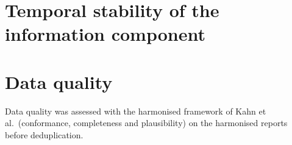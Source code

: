 \documentclass[11pt]{article}
\begin{document}
\begin{table}[htbp]
\centering\small
\caption{Infant design: reports in children younger than \POInfantMonths{} months, VA-MENGOC-BC
against other Finlay vaccines.}
\label{tab:S-disp-infant}
\POTableDispInfantFinlayComparator
\end{table}

\begin{table}[htbp]
\centering\small
\caption{Single-vaccine design: VA-MENGOC-BC given alone against other Finlay vaccines given
alone.}
\label{tab:S-disp-single}
\POTableDispExcludingCoadministration
\end{table}

\begin{table}[htbp]
\centering\small
\caption{Primary design keeping the \PONScheduleInvalid{} VA-MENGOC-BC doses recorded outside the
vaccination schedule.}
\label{tab:S-disp-schedule}
\POTableDispPrimaryIncludingScheduleErrors
\end{table}

\begin{table}[htbp]
\centering\small
\caption{Concomitant vaccines: VA-MENGOC-BC reports with co-administered vaccines against
VA-MENGOC-BC given alone.}
\label{tab:S-disp-concomitant}
\POTableDispConcomitantInfluence
\end{table}

\section{Temporal stability of the information component}\label{sec:S-cumic}
\begin{table}[htbp]
\centering\small
\caption{Cumulative information component (IC) with 95\% credibility interval, recomputed with
the reports accumulated up to the end of each year, for the four most frequently reported events
and for every event meeting the primary signal criterion.}
\label{tab:S-cumic}
\POTableCumulativeIC
\end{table}

\section{Data quality}\label{sec:S-dq}
Data quality was assessed with the harmonised framework of Kahn et al.\ (conformance,
completeness and plausibility) on the harmonised reports before deduplication.

\begin{table}[htbp]
\centering\small
\caption{Completeness: percentage of reports with each key field recorded, by year of the source
file.}
\label{tab:S-completeness}
\POTableCompleteness
\end{table}
\end{document}

